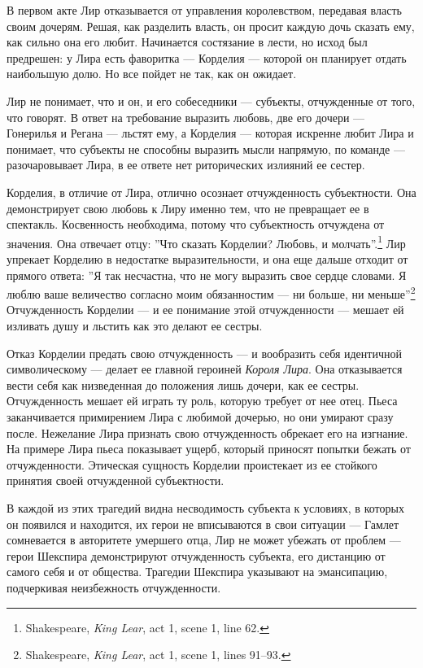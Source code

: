 \documentclass[12pt]{book}
\begin{document}
В первом акте Лир отказывается от управления королевством, передавая власть своим дочерям. Решая, как разделить власть, он просит каждую дочь сказать ему, как сильно она его любит. Начинается состязание в лести, но исход был предрешен: у Лира есть фаворитка --- Корделия --- которой он планирует отдать наибольшую долю. Но все пойдет не так, как он ожидает.

Лир не понимает, что и он, и его собеседники --- субъекты, отчужденные от того, что говорят. В ответ на требование выразить любовь, две его дочери --- Гонерилья и Регана --- льстят ему, а Корделия --- которая искренне любит Лира и понимает, что субъекты не способны выразить мысли напрямую, по команде --- разочаровывает Лира, в ее ответе нет риторических излияний ее сестер.

Корделия, в отличие от Лира, отлично осознает отчужденность субъектности. Она демонстрирует свою любовь к Лиру именно тем, что не превращает ее в спектакль. Косвенность необходима, потому что субъектность отчуждена от значения. Она отвечает отцу: ''Что сказать Корделии? Любовь, и молчать''.\footnote{Shakespeare, \textit{King Lear}, act 1, scene 1, line 62.} Лир упрекает Корделию в недостатке выразительности, и она еще дальше отходит от прямого ответа: ''Я так несчастна, что не могу выразить свое сердце словами. Я люблю ваше величество согласно моим обязанностим --- ни больше, ни меньше''\footnote{Shakespeare, \textit{King Lear}, act 1, scene 1, lines 91–93.} Отчужденность Корделии --- и ее понимание этой отчужденности --- мешает ей изливать душу и льстить как это делают ее сестры.

Отказ Корделии предать свою отчужденность --- и вообразить себя идентичной символическому --- делает ее главной героиней \textit{Короля Лира}. Она отказывается вести себя как низведенная до положения лишь дочери, как ее сестры. Отчужденность мешает ей играть ту роль, которую требует от нее отец. Пьеса заканчивается примирением Лира с любимой дочерью, но они умирают сразу после. Нежелание Лира признать свою отчужденность обрекает его на изгнание. На примере Лира пьеса показывает ущерб, который приносят попытки бежать от отчужденности. Этическая сущность Корделии проистекает из ее стойкого принятия своей отчужденной субъектности.

В каждой из этих трагедий видна несводимость субъекта к условиях, в которых он появился и находится, их герои не вписываются в свои ситуации --- Гамлет сомневается в авторитете умершего отца, Лир не может убежать от проблем --- герои Шекспира демонстрируют отчужденность субъекта, его дистанцию от самого себя и от общества. Трагедии Шекспира указывают на эмансипацию, подчеркивая неизбежность отчужденности.
\end{document}
